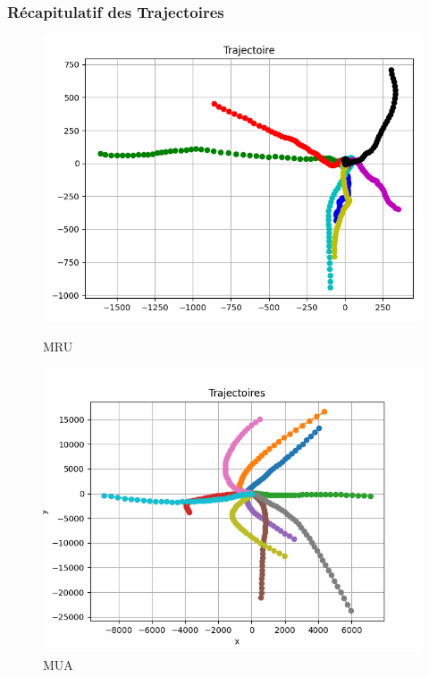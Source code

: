 \documentclass{beamer}
\begin{document}
\begin{frame}
    \frametitle{Récapitulatif des Trajectoires}
    \begin{figure}
    \centering
    \begin{minipage}{0.3\textwidth}
        \centering
        \includegraphics[width=\textwidth]{images/MRU_Trajectoires.png}
        \caption{MRU}
    \end{minipage}
    \begin{minipage}{0.3\textwidth}
        \centering
        \includegraphics[width=\textwidth]{images/MUA_Trajectoires.png}
        \caption{MUA}
    \end{minipage}
    \begin{minipage}{0.3\textwidth}

\end{minipage}
\end{figure}
\end{frame}
\end{document}
